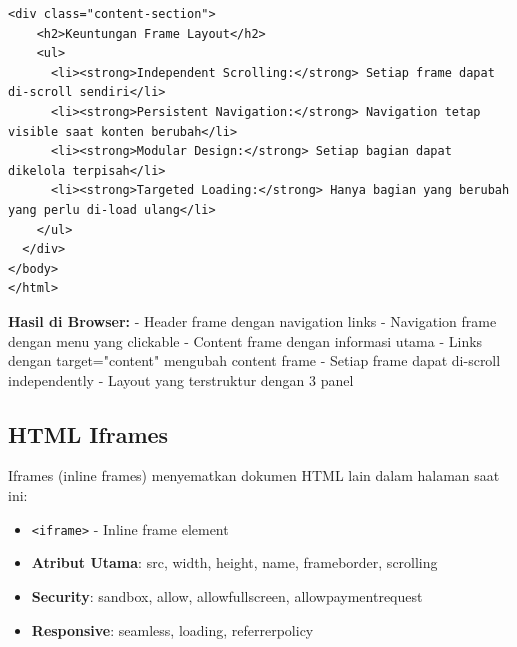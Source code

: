 \begin{lstlisting}[caption={Frame Attributes dan Targeting}, basicstyle=\ttfamily\small, frame=single]
  <div class="content-section">
    <h2>Keuntungan Frame Layout</h2>
    <ul>
      <li><strong>Independent Scrolling:</strong> Setiap frame dapat di-scroll sendiri</li>
      <li><strong>Persistent Navigation:</strong> Navigation tetap visible saat konten berubah</li>
      <li><strong>Modular Design:</strong> Setiap bagian dapat dikelola terpisah</li>
      <li><strong>Targeted Loading:</strong> Hanya bagian yang berubah yang perlu di-load ulang</li>
    </ul>
  </div>
</body>
</html>
\end{lstlisting}

\textbf{Hasil di Browser:}
- Header frame dengan navigation links
- Navigation frame dengan menu yang clickable
- Content frame dengan informasi utama
- Links dengan target="content" mengubah content frame
- Setiap frame dapat di-scroll independently
- Layout yang terstruktur dengan 3 panel

\subsection{HTML Iframes}

Iframes (inline frames) menyematkan dokumen HTML lain dalam halaman saat ini:

\begin{itemize}
  \item \texttt{<iframe>} - Inline frame element
  \item \textbf{Atribut Utama}: src, width, height, name, frameborder, scrolling
  \item \textbf{Security}: sandbox, allow, allowfullscreen, allowpaymentrequest
  \item \textbf{Responsive}: seamless, loading, referrerpolicy
\end{itemize}

